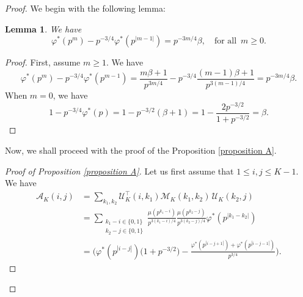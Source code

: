 \documentclass[a4paper,12pt, reqn0]{amsart}
\newtheorem{lemma}{Lemma}[section]
\theoremstyle{remark}
\newcommand{\bt}{\beta}
\newcommand{\fr}{\frac}
\newcommand{\U}{\mathcal{U}}
\newcommand{\Mcal}{\mathcal{M}}
\newcommand{\A}{\mathcal{A}}
\begin{document}
\begin{proof}
\medskip

We begin with the following lemma:
\begin{lemma}
\label{gpm}
We have
$$
\varphi^*(p^m) - p^{-3/4} \varphi^*(p^{|m-1|}) = p^{-3m/4} \bt, \quad \text{for all } \, m \geq 0. 
$$
\end{lemma}
\begin{proof}
First, assume $m \geq 1$. We have
\begin{equation*}
\varphi^*(p^m) - p^{-3/4} \varphi^*(p^{m-1}) = \frac{ m\bt + 1}{p^{3m/4}} - p^{-3/4} \frac{(m-1)\bt + 1}{p^{3(m-1)/4}} = p^{-3m/4} \bt .
\end{equation*}
When $m=0$, we have
\begin{equation*}
1 - p^{-3/4} \varphi^*(p) = 1 - p^{-3/2}(\bt+1) = 1 - \frac{2p^{-3/2}}{1 + p^{-3/2}} = \bt. 
\end{equation*}
\end{proof}
%
Now, we shall proceed with the proof of the Proposition \ref{proposition A}.
%
\begin{proof}[Proof of Proposition \ref{proposition A}]

Let us first assume that $1 \leq i, j \leq K-1$. We have 
%
\begin{equation}
\begin{split}
\label{Aij}
\A_K(i,j) &= \sum\limits_{k_1, k_2} \U_K^{\top}(i, k_1) \Mcal_K(k_1, k_2) \,\U_K(k_2, j)\\
&= \sum\limits_{\substack{k_1 - i \in \{0,1\} \\ k_2 - j \in \{0,1\} } } \frac{\mu(p^{k_1 - i})}{p^{3(k_1-i)/4}} \frac{\mu(p^{k_2 - j})}{p^{3(k_2-j)/4}} \varphi^*(p^{|k_1 - k_2|})\\
&= \biggl( \varphi^*(p^{|i-j|}) \bigl( 1 + p^{-3/2} \bigr) - \frac{\varphi^*(p^{|i-j+1|}) + \varphi^*(p^{|i-j-1|}) }{p^{3/4}} \biggr).
\end{split}
\end{equation}



\end{proof}
\end{proof}
\end{document}
